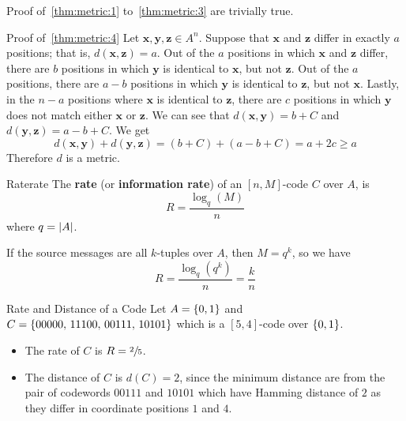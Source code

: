 \begin{Proof}{}{}

    Proof of~\ref{thm:metric:1} to~\ref{thm:metric:3} are trivially true.

    Proof of~\ref{thm:metric:4} Let $ \symbf{x},\symbf{y},\symbf{z}\in A^n $. Suppose that $ \symbf{x} $
    and $ \symbf{z} $ differ in exactly $ a $ positions; that is, $ d(\symbf{x},\symbf{z})=a $.
    Out of the $ a $ positions in which $ \symbf{x} $ and $ \symbf{z} $ differ,
    there are $ b $ positions in which $ \symbf{y} $ is identical to
    $ \symbf{x} $, but not $ \symbf{z} $. Out of the $ a $ positions,
    there are $ a-b $ positions in which $ \symbf{y} $ is identical to
    $ \symbf{z} $, but not $ \symbf{x} $. Lastly, in the $ n-a $ positions
    where $ \symbf{x} $ is identical to $ \symbf{z} $, there are $ c $
    positions in which $ \symbf{y} $ does not match either
    $ \symbf{x} $ or $ \symbf{z} $. We can see that
    $ d(\symbf{x},\symbf{y})=b+C $ and $ d(\symbf{y},\symbf{z})=a-b+C $. We get
    \[ d(\symbf{x},\symbf{y})+d(\symbf{y},\symbf{z})=(b+C) + (a-b+C)=a+2c\geqslant a \]
    Therefore $ d $ is a metric.
\end{Proof}

\begin{Definition}{Rate}{rate}
    The \textbf{rate} (or \textbf{information rate}) of an $ [n,M] $-code $ C $ over
    $ A $, is
    \[ R=\frac{\log_q(M)}{n} \]
    where $ q=\lvert A\rvert $.

    If the source messages are all $ k $-tuples over $ A $, then $ M=q^k $, so we have
    \[ R=\frac{\log_q(q^k)}{n}=\frac{k}{n}  \]
\end{Definition}

\begin{Example}{Rate and Distance of a Code}{}
    Let $ A=\{0,1\} $ and $ C=\{00000,\,11100,\,00111,\,10101\} $ which is a
    $ [5,4] $-code over $ \{0,1\} $.
    \begin{itemize}
        \item The rate of $ C $ is $ R=\sfrac{2}{5} $.
        \item The distance of $ C $ is $ d(C)=2 $, since the minimum distance
              are from the pair of codewords $ 00111 $ and $ 10101 $ which
              have Hamming distance of $ 2 $ as they differ in coordinate
              positions $ 1 $ and $ 4 $.
    \end{itemize}
\end{Example}
